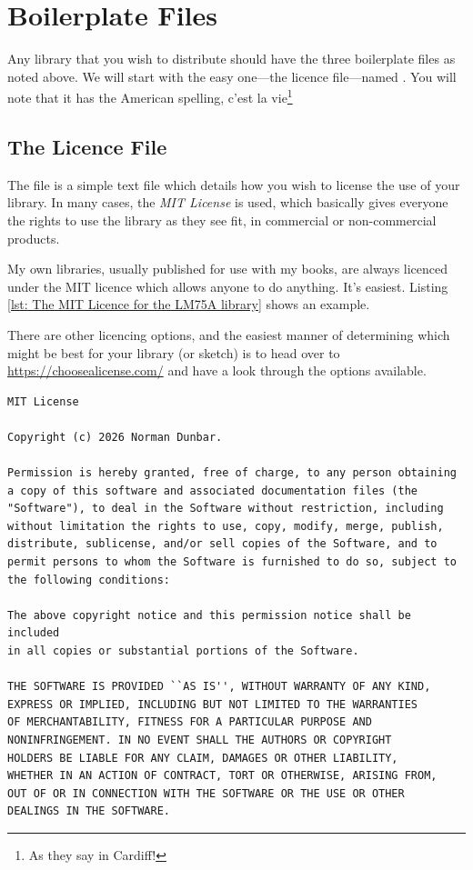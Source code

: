 \chapter{Boilerplate Files}

Any library that you wish to distribute should have the three boilerplate files as noted above. We will start with the easy one---the licence file---named . You will note that it has the American spelling, c'est la vie\footnote{As they say in Cardiff!}

\section{The Licence File}

The  file is a simple text file which details how you wish to license the use of your library. In many cases, the \emph{MIT License} is used, which basically gives everyone the rights to use the library as they see fit, in commercial or non-commercial products.

My own libraries, usually published for use with my books, are always licenced under the MIT licence which allows anyone to do anything. It's easiest. Listing \ref{lst: The MIT Licence for the LM75A library} shows an example.

There are other licencing options, and the easiest manner of determining which might be best for your library (or sketch) is to head over to \url{https://choosealicense.com/} and have a look through the options available.

\begin{lstlisting}[caption={The MIT Licence for the LM75\_AB library.},label={lst: The MIT Licence for the LM75A library}]
MIT License

Copyright (c) 2026 Norman Dunbar.

Permission is hereby granted, free of charge, to any person obtaining
a copy of this software and associated documentation files (the
"Software"), to deal in the Software without restriction, including
without limitation the rights to use, copy, modify, merge, publish,
distribute, sublicense, and/or sell copies of the Software, and to
permit persons to whom the Software is furnished to do so, subject to
the following conditions:

The above copyright notice and this permission notice shall be included
in all copies or substantial portions of the Software.

THE SOFTWARE IS PROVIDED ``AS IS'', WITHOUT WARRANTY OF ANY KIND,
EXPRESS OR IMPLIED, INCLUDING BUT NOT LIMITED TO THE WARRANTIES
OF MERCHANTABILITY, FITNESS FOR A PARTICULAR PURPOSE AND
NONINFRINGEMENT. IN NO EVENT SHALL THE AUTHORS OR COPYRIGHT
HOLDERS BE LIABLE FOR ANY CLAIM, DAMAGES OR OTHER LIABILITY,
WHETHER IN AN ACTION OF CONTRACT, TORT OR OTHERWISE, ARISING FROM,
OUT OF OR IN CONNECTION WITH THE SOFTWARE OR THE USE OR OTHER
DEALINGS IN THE SOFTWARE.
\end{lstlisting}

